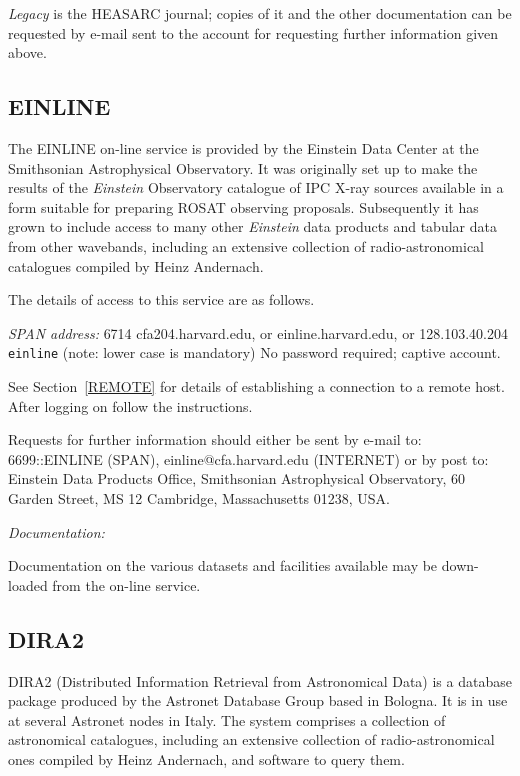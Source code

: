 {\it Legacy} is the HEASARC journal; copies of it and the other 
documentation can be requested by e-mail sent to the account for 
requesting further information given above.

\subsection{EINLINE}

The EINLINE on-line service is provided by the Einstein Data Center at
the Smithsonian Astrophysical Observatory. It was originally set up to
make the results of the {\it Einstein} Observatory catalogue of IPC 
X-ray sources available in a form suitable for preparing ROSAT observing
proposals. Subsequently it has grown to include access to many other 
{\it Einstein} data products and tabular data from other wavebands,
including an extensive collection of radio-astronomical catalogues
compiled by Heinz Andernach.

The details of access to this service are as follows.

{\it SPAN address: } 6714
 cfa204.harvard.edu, or 
einline.harvard.edu, or 128.103.40.204
 \verb-einline- (note: lower case is mandatory)
 No password required; captive account.

See Section~\ref{REMOTE} for details of establishing a connection to
a remote host. After logging on follow the instructions.

Requests for further information should either be sent by e-mail to:
6699::EINLINE (SPAN), einline@cfa.harvard.edu (INTERNET) or by post to: 
Einstein Data Products Office, Smithsonian Astrophysical Observatory, 
60 Garden Street, MS 12 Cambridge, Massachusetts 01238, USA.

{\it Documentation:}

Documentation on the various datasets and facilities available may be
down-loaded from the on-line service.

\subsection{DIRA2}

DIRA2 (Distributed Information Retrieval from Astronomical Data) is a
database package produced by the Astronet Database Group based in 
Bologna. It is in use at several Astronet nodes in Italy. The system
comprises a collection of astronomical catalogues, including an 
extensive collection of radio-astronomical ones compiled by Heinz 
Andernach, and software to query
them.


